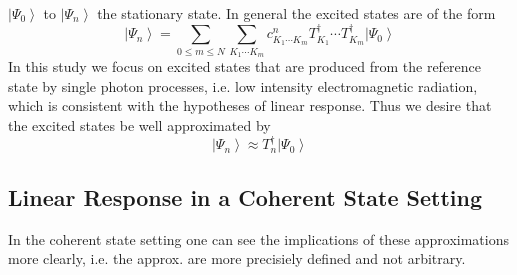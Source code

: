 \documentclass[aps,preprint]{revtex4}%
\begin{document}
$\left\vert \Psi_{0}\right\rangle $ to $\left\vert \Psi_{n}\right\rangle $ the
stationary state. In general the excited states are of the form%
\begin{equation}
\left\vert \Psi_{n}\right\rangle =\sum_{0\leq m\leq N}\sum_{K_{1}\cdots K_{m}%
}c_{K_{1}\cdots K_{m}}^{n}T_{K_{1}}^{\dagger}\cdots T_{K_{m}}^{\dagger
}\left\vert \Psi_{0}\right\rangle
\end{equation}
In this study we focus on excited states that are produced from the reference
state by single photon processes, i.e. low intensity electromagnetic
radiation, which is consistent with the hypotheses of linear response. Thus we
desire that the excited states be well approximated by%
\begin{equation}
\left\vert \Psi_{n}\right\rangle \approx T_{n}^{\dagger}\left\vert \Psi
_{0}\right\rangle
\end{equation}


\subsection{Linear Response in a Coherent State Setting}

In the coherent state setting one can see the implications of these
approximations more clearly, i.e. the approx. are more precisiely defined and
not arbitrary.
\end{document}
